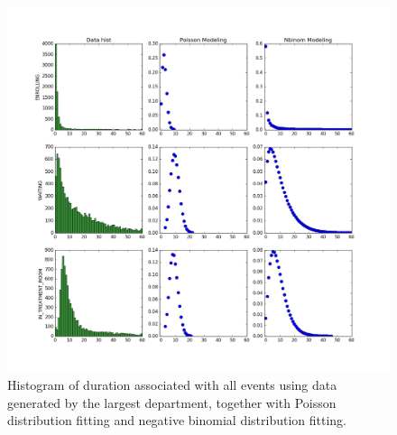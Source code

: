 \begin{figure}[!ht]
	\begin{center}
		\includegraphics[width=\textwidth]{images/depStat}
		\caption{Histogram of duration associated with all events using data generated by the largest department, together with Poisson distribution fitting and negative binomial distribution fitting.}
		\label{fig:depStat}
	\end{center}
\end{figure}

